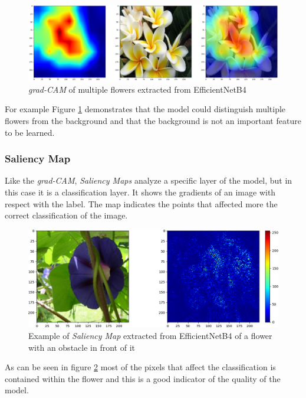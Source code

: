 \begin{figure}[ht!]
\centering
\includegraphics[width=1\textwidth]{images/grad_multi.png} 
\caption{\textit{grad-CAM} of multiple flowers extracted from EfficientNetB4}
\label{fig:grad_multi}
\end{figure}

For example Figure \ref{fig:grad_multi} demonstrates that the model could distinguish multiple flowers from the background and that the background is not an important 
feature to be learned.


\subsubsection{Saliency Map}
Like the \textit{grad-CAM}, \textit{Saliency Maps} analyze a specific layer of the model, but in this case it is a classification layer. It shows the gradients of
an image with respect with the label. The map indicates the points that affected more the correct classification of the image.
\begin{figure}[ht!]
\centering
\includegraphics[width=1\textwidth]{images/sal3.png} 
\caption{Example of \textit{Saliency Map} extracted from EfficientNetB4 of a flower with an obstacle in front of it}
\label{fig:sal}
\end{figure}

As can be seen in figure \ref{fig:sal} most of the pixels that affect the
classification is contained within the flower and this is a good indicator
of the quality of the model.







